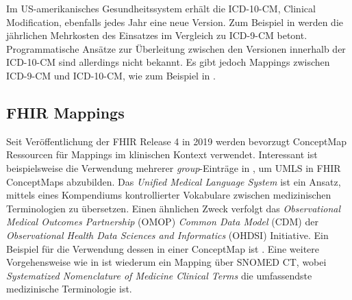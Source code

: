 \newpage

Im US-amerikanisches Gesundheitssystem erhält die ICD-10-CM, Clinical Modification, ebenfalls jedes Jahr eine neue Version. Zum Beispiel in \cite{manchikanti2015tragedy} werden die jährlichen Mehrkosten des Einsatzes im Vergleich zu ICD-9-CM betont. Programmatische Ansätze zur Überleitung zwischen den Versionen innerhalb der ICD-10-CM sind allerdings nicht bekannt. Es gibt jedoch Mappings zwischen ICD-9-CM und ICD-10-CM, wie zum Beispiel in \cite{info:doi/10.2196/14325}.

\subsection{FHIR Mappings}

Seit Veröffentlichung der FHIR Release 4 in 2019 werden bevorzugt ConceptMap Ressourcen für Mappings im klinischen Kontext verwendet. Interessant ist beispielsweise die Verwendung mehrerer \emph{group}-Einträge in \cite{saripalle2019representing}, um UMLS in FHIR ConceptMaps abzubilden. Das \emph{Unified Medical Language System} ist ein Ansatz, mittels eines Kompendiums kontrollierter Vokabulare zwischen medizinischen Terminologien zu übersetzen. Einen ähnlichen Zweck verfolgt das \emph{Observational Medical Outcomes Partnership} (OMOP) \emph{Common Data Model} (CDM) der \emph{Observational Health Data Sciences and Informatics} (OHDSI) Initiative. Ein Beispiel für die Verwendung dessen in einer ConceptMap ist \cite{10.1093/jamiaopen/ooae045}. Eine weitere Vorgehensweise wie in \cite{fhir-snomed} ist wiederum ein Mapping über SNOMED CT, wobei \emph{Systematized Nomenclature of Medicine Clinical Terms} die umfassendste medizinische Terminologie ist.

\begin{comment}

--------------

UMLS

\bibitem{UMLS FHIR}
``An Interoperable UMLS Terminology Service Using FHIR'' \newline
\url{https://www.mdpi.com/1999-5903/12/11/199}

\bibitem{UMLS FHIR 2}
``Representing UMLS knowledge using FHIR Terminological Resources'' \newline
\url{https://ieeexplore.ieee.org/abstract/document/8983305}

--------------

\bibitem{MENDS-on-FHIR}
``MENDS-on-FHIR: Leveraging the OMOP common data model and FHIR standards for national chronic disease surveillance'' \newline
\url{https://www.medrxiv.org/content/10.1101/2023.08.09.23293900v2}

\end{comment}


